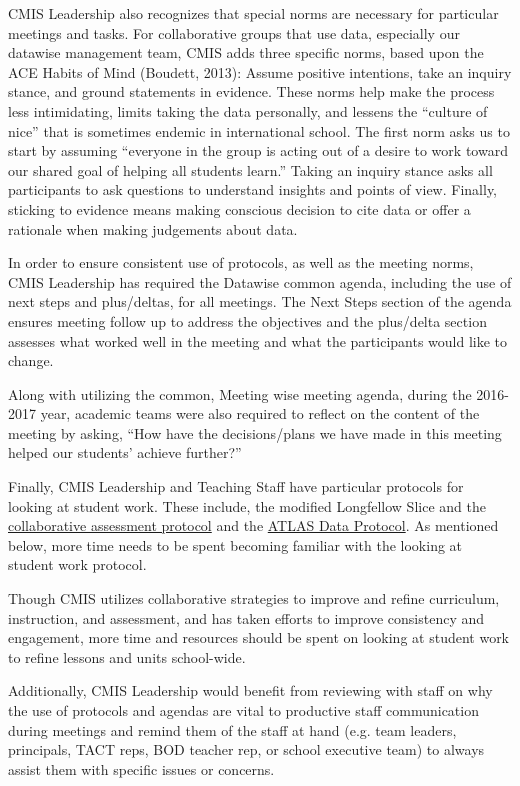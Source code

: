 \begin{findings}
CMIS Leadership also recognizes that special norms are necessary for particular meetings and tasks. For collaborative groups that use data, especially our datawise management team, CMIS adds three specific norms, based upon the ACE Habits of Mind (Boudett, 2013): Assume positive intentions, take an inquiry stance, and ground statements in evidence. These norms help make the process less intimidating, limits taking the data personally, and lessens the “culture of nice” that is sometimes endemic in international school. The first norm asks us to start by assuming “everyone in the group is acting out of a desire to work toward our shared goal of helping all students learn.” Taking an inquiry stance asks all participants to ask questions to understand insights and points of view. Finally, sticking to evidence means making conscious decision to cite data or offer a rationale when making judgements about data. 

In order to ensure consistent use of protocols, as well as the meeting norms, CMIS Leadership has required the Datawise common agenda, including the use of next steps and plus/deltas, for all meetings. The  Next Steps section of the  agenda ensures meeting follow up to address the objectives and the plus/delta section assesses what worked well in the meeting and what the participants would like to change. 

Along with utilizing the common, Meeting wise meeting agenda, during the 2016-2017 year, academic teams were also required to reflect on the content of the meeting by asking, “How have the decisions/plans we have made in this meeting helped our students’ achieve further?”

Finally, CMIS Leadership and Teaching Staff have particular protocols for looking at student work. These include, the modified Longfellow Slice and the \href{https://docs.google.com/a/cmis.ac.th/document/d/1vC3OD8DgzLVl3_FikEvwSYsbSwEngsDfMOKV6fl7k9M/edit?usp=sharing}{collaborative assessment protocol} and the \href{https://docs.google.com/a/cmis.ac.th/document/d/1cVbpi_Fs4PP7foojiq3we0WA3RK4TuYiI9ConlNRPtI/edit?usp=sharing}{ATLAS Data Protocol}. As mentioned below, more time needs to be spent becoming familiar with the looking at student work protocol. 


Though CMIS utilizes collaborative strategies to improve and refine curriculum, instruction, and assessment, and has taken efforts to improve consistency and engagement, more time and resources should be spent on looking at student work to refine lessons and units school-wide.

Additionally, CMIS Leadership would benefit from reviewing with staff on why the use of protocols and agendas are vital to productive staff communication during meetings and remind them of the staff at hand (e.g. team leaders, principals, TACT reps, BOD teacher rep, or school executive team) to always assist them with specific issues or concerns.
\end{findings}

